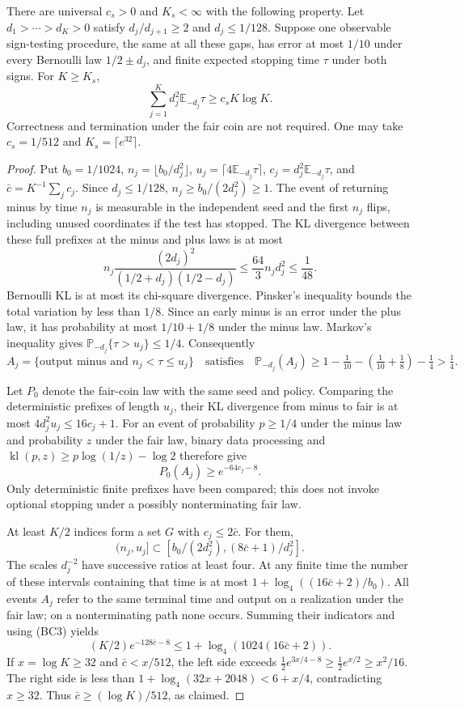 \begin{lemma}\label{lem:finite-sign-entropy}
There are universal $c_s>0$ and $K_s<\infty$ with the following property.
Let $d_1>\cdots>d_K>0$ satisfy $d_j/d_{j+1}\ge2$ and
$d_j\le1/128$. Suppose one observable sign-testing procedure, the same
at all these gaps, has error at most $1/10$ under every Bernoulli law
$1/2\pm d_j$, and finite expected stopping time $\tau$ under both signs.
For $K\ge K_s$,
\[
              \sum_{j=1}^K d_j^2\mathbb E_{-d_j}\tau
                   \ge c_s K\log K.                    \tag{BC2}
\]
Correctness and termination under the fair coin are not required.
One may take $c_s=1/512$ and $K_s=\lceil e^{32}\rceil$.
\end{lemma}
\begin{proof}
Put $b_0=1/1024$, $n_j=\lfloor b_0/d_j^2\rfloor$,
$u_j=\lceil4\mathbb E_{-d_j}\tau\rceil$,
$c_j=d_j^2\mathbb E_{-d_j}\tau$, and
$\bar c=K^{-1}\sum_jc_j$. Since $d_j\le1/128$,
$n_j\ge b_0/(2d_j^2)\ge1$. The event of returning minus by time $n_j$
is measurable in the independent seed and the first $n_j$ flips, including
unused coordinates if the test has stopped. The KL divergence between
these full prefixes at the minus and plus laws is at most
\[
 n_j\frac{(2d_j)^2}{(1/2+d_j)(1/2-d_j)}
 \le\frac{64}{3}n_jd_j^2\le\frac1{48}.
\]
Bernoulli KL is at most its chi-square divergence. Pinsker's inequality
bounds the total variation by less than $1/8$. Since an early minus is
an error under the plus law, it has probability at most $1/10+1/8$ under
the minus law. Markov's inequality gives
$\mathbb P_{-d_j}\{\tau>u_j\}\le1/4$. Consequently
\[
 A_j=\{\text{output minus and }n_j<\tau\le u_j\}
 \quad\text{satisfies}\quad
 \mathbb P_{-d_j}(A_j)
 \ge1-\tfrac1{10}-(\tfrac1{10}+\tfrac18)-\tfrac14>\tfrac14.
\]

Let $P_0$ denote the fair-coin law with the same seed and policy. Comparing
the deterministic prefixes of length $u_j$, their KL divergence from
minus to fair is at most
$4d_j^2u_j\le16c_j+1$. For an event of probability $p\ge1/4$ under
the minus law and probability $z$ under the fair law, binary data
processing and $\operatorname{kl}(p,z)\ge p\log(1/z)-\log2$ therefore give
\[
                     P_0(A_j)\ge e^{-64c_j-8}.          \tag{BC3}
\]
Only deterministic finite prefixes have been compared; this does not
invoke optional stopping under a possibly nonterminating fair law.

At least $K/2$ indices form a set $G$ with $c_j\le2\bar c$. For them,
\[
 (n_j,u_j]\subset
 [b_0/(2d_j^2),(8\bar c+1)/d_j^2].
\]
The scales $d_j^{-2}$ have successive ratios at least four. At any finite
time the number of these intervals containing that time is at most
$1+\log_4((16\bar c+2)/b_0)$. All events $A_j$ refer to the same terminal
time and output on a realization under the fair law; on a nonterminating
path none occurs. Summing their indicators and using (BC3) yields
\[
 (K/2)e^{-128\bar c-8}
        \le1+\log_4(1024(16\bar c+2)).                  \tag{BC4}
\]
If $x=\log K\ge32$ and $\bar c<x/512$, the left side exceeds
$\tfrac12e^{3x/4-8}\ge\tfrac12e^{x/2}\ge x^2/16$.
The right side is less than
$1+\log_4(32x+2048)<6+x/4$, contradicting $x\ge32$.
Thus $\bar c\ge(\log K)/512$, as claimed.
\end{proof}

